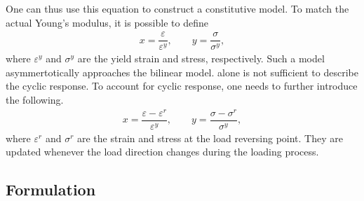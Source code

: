 One can thus use this equation to construct a constitutive model.
To match the actual Young's modulus, it is possible to define
\begin{gather}\label{eq:mpf_scaled}
	x=\dfrac{\varepsilon}{\varepsilon^y},\qquad
	y=\dfrac{\sigma}{\sigma^y},
\end{gather}
where $\varepsilon^y$ and $\sigma^y$ are the yield strain and stress, respectively.
Such a model asymmertotically approaches the bilinear model.
 alone is not sufficient to describe the cyclic response.
To account for cyclic response, one needs to further introduce the following.
\begin{gather}
	x=\dfrac{\varepsilon-\varepsilon^r}{\varepsilon^y},\qquad
	y=\dfrac{\sigma-\sigma^r}{\sigma^y},
\end{gather}
where $\varepsilon^r$ and $\sigma^r$ are the strain and stress at the load reversing point.
They are updated whenever the load direction changes during the loading process.
\subsection{Formulation}
